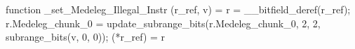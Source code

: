 function _set_Medeleg_Illegal_Instr (r_ref, v) = {
    r = __bitfield_deref(r_ref);
    r.Medeleg_chunk_0 = update_subrange_bits(r.Medeleg_chunk_0, 2, 2, subrange_bits(v, 0, 0));
    (*r_ref) = r
}
